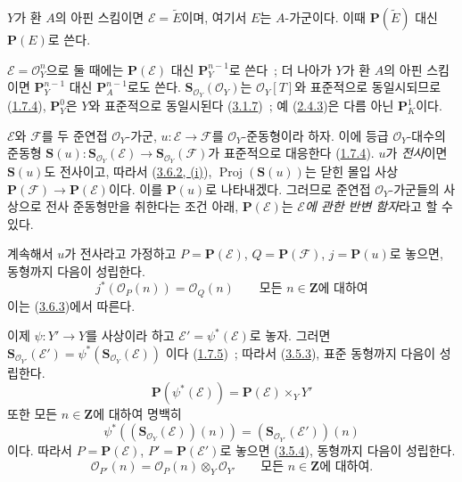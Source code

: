 $Y$가 환 $A$의 아핀 스킴이면 $\mathcal{E}=\widetilde{E}$이며, 여기서
$E$는 $A$-가군이다. 이때 $\mathbf{P}(\widetilde{E})$ 대신
$\mathbf{P}(E)$로 쓴다.

$\mathcal{E}=\mathcal{O}_Y^n$으로 둘 때에는
$\mathbf{P}(\mathcal{E})$ 대신 $\mathbf{P}_Y^{n-1}$로 쓴다~; 더 나아가
$Y$가 환 $A$의 아핀 스킴이면 $\mathbf{P}_Y^{n-1}$ 대신
$\mathbf{P}_A^{n-1}$로도 쓴다.
$\mathbf{S}_{\mathcal{O}_Y}(\mathcal{O}_Y)$는 $\mathcal{O}_Y[T]$와
표준적으로 동일시되므로 (\hyperref[II.1.7.4-ko]{1.7.4}),
$\mathbf{P}_Y^0$은 $Y$와 표준적으로 동일시된다
(\hyperref[II.3.1.7-ko]{3.1.7})~; 예
(\hyperref[II.2.4.3-ko]{2.4.3})은 다름 아닌 $\mathbf{P}_K^1$이다.

\begin{env}[4.1.2]
\label{II.4.1.2-ko}
$\mathcal{E}$와 $\mathcal{F}$를 두 준연접 $\mathcal{O}_Y$-가군,
$u:\mathcal{E}\to\mathcal{F}$를 $\mathcal{O}_Y$-준동형이라 하자. 이에
등급 $\mathcal{O}_Y$-대수의 준동형
$\mathbf{S}(u):\mathbf{S}_{\mathcal{O}_Y}(\mathcal{E})\to
\mathbf{S}_{\mathcal{O}_Y}(\mathcal{F})$가 표준적으로 대응한다
(\hyperref[II.1.7.4-ko]{1.7.4}). $u$가 \emph{전사}이면
$\mathbf{S}(u)$도 전사이고, 따라서
(\hyperref[II.3.6.2-ko]{3.6.2, (i)}),
$\operatorname{Proj}(\mathbf{S}(u))$는 닫힌 몰입 사상
$\mathbf{P}(\mathcal{F})\to\mathbf{P}(\mathcal{E})$이다. 이를
$\mathbf{P}(u)$로 나타내겠다. 그러므로 준연접 $\mathcal{O}_Y$-가군들의
사상으로 전사 준동형만을 취한다는 조건 아래, $\mathbf{P}(\mathcal{E})$는
\emph{$\mathcal{E}$에 관한 반변 함자}라고 할 수 있다.

계속해서 $u$가 전사라고 가정하고
$P=\mathbf{P}(\mathcal{E})$, $Q=\mathbf{P}(\mathcal{F})$,
$j=\mathbf{P}(u)$로 놓으면, 동형까지 다음이 성립한다.
\[
\label{II.4.1.2.1-ko}
  j^*(\mathcal{O}_P(n))=\mathcal{O}_Q(n)
  \qquad\text{모든 }n\in\mathbf{Z}\text{에 대하여}
\tag{4.1.2.1}
\]
이는 (\hyperref[II.3.6.3-ko]{3.6.3})에서 따른다.
\end{env}

\begin{env}[4.1.3]
\label{II.4.1.3-ko}
이제 $\psi:Y'\to Y$를 사상이라 하고
$\mathcal{E}'=\psi^*(\mathcal{E})$로 놓자. 그러면
$\mathbf{S}_{\mathcal{O}_{Y'}}(\mathcal{E}')=
\psi^*(\mathbf{S}_{\mathcal{O}_Y}(\mathcal{E}))$
이다 (\hyperref[II.1.7.5-ko]{1.7.5})~; 따라서
(\hyperref[II.3.5.3-ko]{3.5.3}), 표준 동형까지 다음이 성립한다.
\[
\label{II.4.1.3.1-ko}
  \mathbf{P}(\psi^*(\mathcal{E}))=
  \mathbf{P}(\mathcal{E})\times_YY'
\tag{4.1.3.1}
\]
또한 모든 $n\in\mathbf{Z}$에 대하여 명백히
\[
  \psi^*((\mathbf{S}_{\mathcal{O}_Y}(\mathcal{E}))(n))
  =(\mathbf{S}_{\mathcal{O}_{Y'}}(\mathcal{E}'))(n)
\]
이다. 따라서 $P=\mathbf{P}(\mathcal{E})$,
$P'=\mathbf{P}(\mathcal{E}')$로 놓으면
(\hyperref[II.3.5.4-ko]{3.5.4}), 동형까지 다음이 성립한다.
\[
\label{II.4.1.3.2-ko}
  \mathcal{O}_{P'}(n)=\mathcal{O}_P(n)\otimes_Y\mathcal{O}_{Y'}
  \qquad\text{모든 }n\in\mathbf{Z}\text{에 대하여}.
\tag{4.1.3.2}
\]
\end{env}

